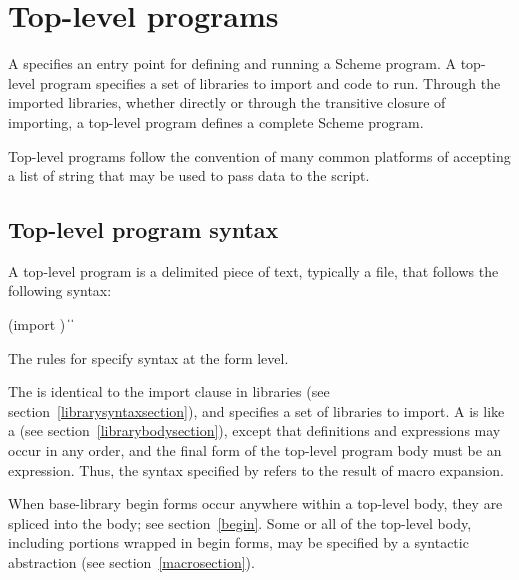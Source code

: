 \chapter{Top-level programs}
\label{programchapter}

A  specifies an entry point for defining and running
a Scheme program.  A top-level program specifies a set of libraries to import and
code to run.  Through the imported libraries, whether directly or through the
transitive closure of importing, a top-level program defines a complete Scheme
program.

Top-level programs follow the convention of many common platforms of accepting 
a list of string  that may be used to
pass data to the script.

\section{Top-level program syntax}

A top-level program is a delimited piece of text, typically a file, that follows
the following syntax:

\begin{grammar}
 \:  
 \: (import )
 \:  
 \: \| 
\> \| 
\end{grammar}

The rules for  specify syntax at the form level.

The  is identical to the import clause in
libraries (see section~\ref{librarysyntaxsection}), 
and specifies a set of libraries to import.  A  is like a  (see
section~\ref{librarybodysection}), except that 
definitions and expressions may occur in any order, and the final
form of the top-level program body must be an expression.  Thus, the syntax
specified by  refers to the result of macro
expansion.

When base-library {\cf begin} forms occur anywhere within a top-level body,
they are spliced into the body; see section~\ref{begin}.
Some or all of the top-level body, including portions wrapped in {\cf begin}
forms, may be specified by a syntactic abstraction
(see section~\ref{macrosection}).

